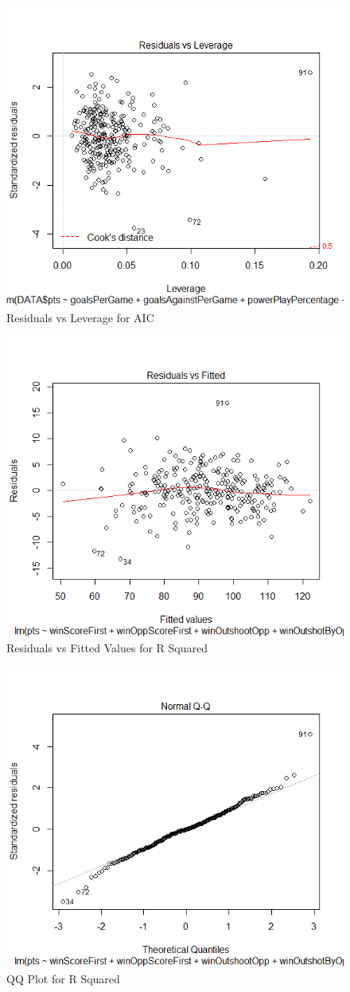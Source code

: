 \begin{figure}
	\centering
	\includegraphics[width=0.7\linewidth]{AIC4}
	\caption{Residuals vs Leverage for AIC}
	\label{fig:Residuals vs Leverage for AIC}
\end{figure}
\begin{figure}
	\centering
	\includegraphics[width=0.7\linewidth]{R1}
	\caption{Residuals vs Fitted Values for R Squared}
	\label{fig:Residuals vs Fitted Values for R Squared}
\end{figure}
\begin{figure}
	\centering
	\includegraphics[width=0.7\linewidth]{R2}
	\caption{QQ Plot for R Squared}
	\label{fig:QQ Plot for R Squared}
\end{figure}
